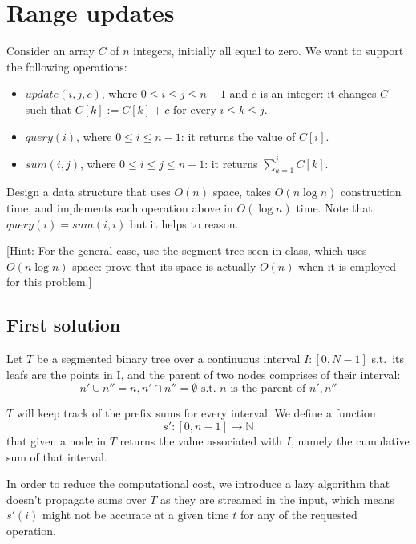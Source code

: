 \section{Range updates}

Consider an array $C$ of $n$ integers, initially all equal to zero. We want to support the following operations:
\begin{itemize}
  \item $update(i, j, c)$, where $0 \leq i \leq j \leq n - 1$ and $c$ is an integer: it changes $C$ such that $C[k] := C[k] + c$ for every $i \leq k \leq j$.
  \item $query(i)$, where $0 \leq i \leq n - 1$: it returns the value of $C[i]$.
  \item $sum(i,j)$, where $0 \leq i \leq j \leq n - 1$: it returns $\sum_{k = 1}^j C[k]$.
\end{itemize}

Design a data structure that uses $O(n)$ space, takes $O(n \log n)$ construction time, and implements each operation above in $O(\log n)$ time. Note that $query(i) = sum(i, i)$ but it helps to reason.

[Hint: For the general case, use the segment tree seen in class, which uses $O(n \log n)$ space: prove that its space is actually $O(n)$ when it is employed for this problem.]

\subsection{First solution}

Let $T$ be a segmented binary tree over a continuous interval $I: [0, N - 1]$
s.t.\ its leafs are the points in I, and the parent of two nodes comprises of their interval:
$$  n' \cup n'' = n, n' \cap n'' = \emptyset   \textrm{ s.t. } n \text{ is the parent of } n', n''$$

$T$ will keep track of the prefix sums for every interval.
We define a function
\begin{equation}
    s': [0, n - 1] \to \mathbb{N}
\end{equation}
that given a node in $T$ returns the value associated with $I$, namely the
cumulative sum of that interval.

In order to reduce the computational cost, we introduce a lazy algorithm
that doesn't propagate sums over $T$ as they are streamed in the input,
which means $s'(i)$ might not be accurate at a given time $t$ for any of the
requested operation.

